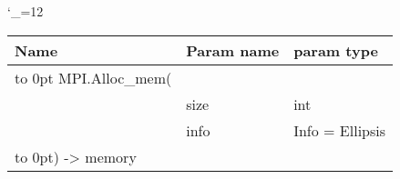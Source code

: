 \begingroup \catcode`\_=12 \tt
\begin{tabular}{lll}
\toprule
\textrm{Name}&\textrm{Param name}&\textrm{param type}\\
\midrule
\hbox to 0pt {MPI.Alloc_mem(\hss}\\
& size & int\\
& info & Info = Ellipsis\\
\hbox to 0pt{) -> memory\hss}\\
\bottomrule
\end{tabular}
\endgroup
